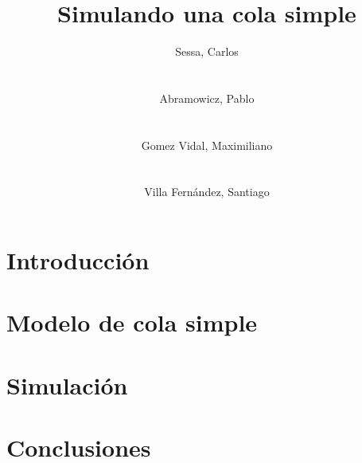 \documentclass{sig-alternate}
\begin{document}
\title{Simulando una cola simple}


\author{
    \alignauthor
    Sessa, Carlos\\
     \\
    \ \\
    Abramowicz, Pablo\\
     \\
    \ \\
    \alignauthor
    Gomez Vidal, Maximiliano\\
     \\
    \ \\
    Villa Fern\'{a}ndez, Santiago\\
}

\maketitle

\begin{abstract}
\end{abstract}

\keywords{}

\section{Introducci\'{o}n}\label{introduccion}

\section{Modelo de cola simple}\label{modelo}

\section{Simulación}\label{simulacion}

\section{Conclusiones}\label{conclusiones}
\end{document}

